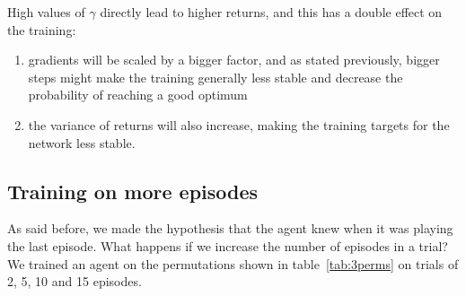 High values of $\gamma$ directly lead to higher returns, and this has a
double effect on the training:
\begin{enumerate}
	\item gradients will be scaled by a bigger factor, and as stated previously,
		bigger steps might make the training generally less stable
		and decrease the probability of reaching a good optimum
	\item the variance of returns will also increase, making the training
		targets for the network less stable.
\end{enumerate}


\subsection{Training on more episodes}
\label{section:beyond:moreeps}
As said before, we made the hypothesis that the agent knew when it was playing
the last episode. What happens if we increase the number of episodes in a
trial? We trained an agent on the permutations shown in table~\ref{tab:3perms}
on trials of 2, 5, 10 and 15 episodes.\\
